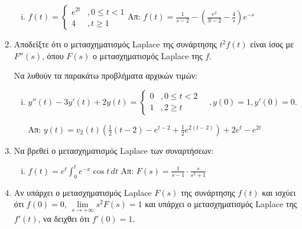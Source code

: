 \begin{enumerate}
\begin{enumerate}[i)]
\item $f(t)=\begin{cases}
e^{2t} & ,0\leq t<1 \\
4 & , t\geq 1
\end{cases}$\hfill Απ: $f(t)=\frac{1}{s-2}-(\frac{e^2}{S-2}-\frac{4}{s})e^{-s}$


\end{enumerate}

\item Αποδείξτε ότι ο μετασχηματισμός \textlatin{Laplace} της συνάρτησης $t^2f(t)$ είναι ίσος με $F''(s)$, όπου $F(s)$ ο μετασχηματισμός \textlatin{Laplace} της $f$.

Να λυθούν τα παρακάτω προβλήματα αρχικών τιμών:

\begin{enumerate}[i)]

\item $y''(t)-3y'(t)+2y(t)=\begin{cases}
0 & , 0\leq t <2 \\
1 & , 2\geq t
\end{cases}
\quad , y(0)=1, y'(0)=0$.

\hfill Απ: $y(t)=v_2(t)(\frac{1}{2}(t-2)-e^{t-2}+\frac{1}{2}e^{2(t-2)})+2e^t-e^{2t}$

\end{enumerate}

\item Να βρεθεί ο μετασχηματισμός \textlatin{Laplace} των συναρτήσεων: 

\begin{enumerate}[i)]

\item $f(t)=e^t\int_{0}^{t}e^{-x}\cos t\,dt$ \hfill Απ: $F(s)=\frac{1}{s-1}\cdot \frac{s}{s^2+1}$

\end{enumerate}

\item Αν υπάρχει ο μετασχηματισμός \textlatin{Laplace} $F(s)$ της συνάρτησης $f(t)$ και ισχύει ότι $f(0)=0$, $\lim\limits_{s\to+\infty}s^2F(s)=1$ και υπάρχει ο μετασχηματισμός \textlatin{Laplace} της $f'(t)$, να δειχθει ότι $f'(0)=1$.

\end{enumerate}







